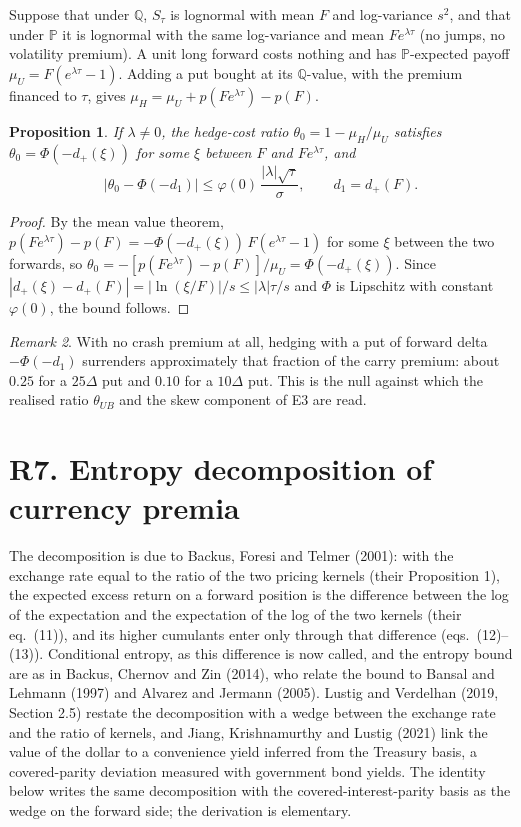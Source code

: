 \documentclass[11pt]{article}
\newtheorem{proposition}{Proposition}
\theoremstyle{remark}
\newtheorem{remark}[proposition]{Remark}
\newcommand{\Q}{\mathbb{Q}}
\renewcommand{\P}{\mathbb{P}}
\begin{document}
Suppose that under $\Q$, $S_\tau$ is lognormal with mean $F$ and log-variance $s^2$, and that under $\P$ it is lognormal with the same log-variance and mean $Fe^{\lambda\tau}$ (no jumps, no volatility premium). A unit long forward costs nothing and has $\P$-expected payoff $\mu_U=F(e^{\lambda\tau}-1)$. Adding a put bought at its $\Q$-value, with the premium financed to $\tau$, gives $\mu_H=\mu_U+p(Fe^{\lambda\tau})-p(F)$.

\begin{proposition}
If $\lambda\ne0$, the hedge-cost ratio $\theta_0=1-\mu_H/\mu_U$ satisfies $\theta_0=\Phi(-d_+(\xi))$ for some $\xi$ between $F$ and $Fe^{\lambda\tau}$, and
\[
\bigl|\theta_0-\Phi(-d_1)\bigr|\le\varphi(0)\,\frac{|\lambda|\sqrt{\tau}}{\sigma},\qquad d_1=d_+(F).
\]
\end{proposition}

\begin{proof}
By the mean value theorem, $p(Fe^{\lambda\tau})-p(F)=-\Phi(-d_+(\xi))\,F(e^{\lambda\tau}-1)$ for some $\xi$ between the two forwards, so $\theta_0=-[p(Fe^{\lambda\tau})-p(F)]/\mu_U=\Phi(-d_+(\xi))$. Since $|d_+(\xi)-d_+(F)|=|\ln(\xi/F)|/s\le|\lambda|\tau/s$ and $\Phi$ is Lipschitz with constant $\varphi(0)$, the bound follows.
\end{proof}

\begin{remark}
With no crash premium at all, hedging with a put of forward delta $-\Phi(-d_1)$ surrenders approximately that fraction of the carry premium: about $0.25$ for a $25\Delta$ put and $0.10$ for a $10\Delta$ put. This is the null against which the realised ratio $\theta_{UB}$ and the skew component of E3 are read.
\end{remark}

\section*{R7. Entropy decomposition of currency premia}

The decomposition is due to Backus, Foresi and Telmer (2001): with the exchange rate equal to the ratio of the two pricing kernels (their Proposition 1), the expected excess return on a forward position is the difference between the log of the expectation and the expectation of the log of the two kernels (their eq.~(11)), and its higher cumulants enter only through that difference (eqs.~(12)--(13)). Conditional entropy, as this difference is now called, and the entropy bound are as in Backus, Chernov and Zin (2014), who relate the bound to Bansal and Lehmann (1997) and Alvarez and Jermann (2005). Lustig and Verdelhan (2019, Section 2.5) restate the decomposition with a wedge between the exchange rate and the ratio of kernels, and Jiang, Krishnamurthy and Lustig (2021) link the value of the dollar to a convenience yield inferred from the Treasury basis, a covered-parity deviation measured with government bond yields. The identity below writes the same decomposition with the covered-interest-parity basis as the wedge on the forward side; the derivation is elementary.
\end{document}

